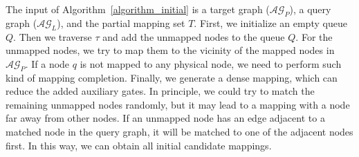 \documentclass[journal]{IEEEtran}
\begin{document}
The input of Algorithm~\ref{algorithm_initial} is a target graph ($\mathcal{AG}_{P}$), a query graph ($\mathcal{AG}_{L}$), and the partial mapping set $T$. First, we initialize an empty queue $Q$.
Then we traverse $\tau$ and add the unmapped nodes to the queue $Q$. For the unmapped nodes, we try to map them to the vicinity of the mapped nodes in $\mathcal{AG}_{P}$. If a node $\textit{q}$ is not mapped to any physical node, we need to perform such kind of mapping completion. Finally, we generate a dense mapping, which can reduce the added auxiliary gates. In principle, we could try to match the remaining unmapped nodes randomly, but it may lead to a mapping with a node far away from other nodes. If an unmapped node has an edge adjacent to a matched node in the query graph, it will be matched to one of the adjacent nodes first.  In this way, we can obtain all initial candidate mappings.
\end{document}

